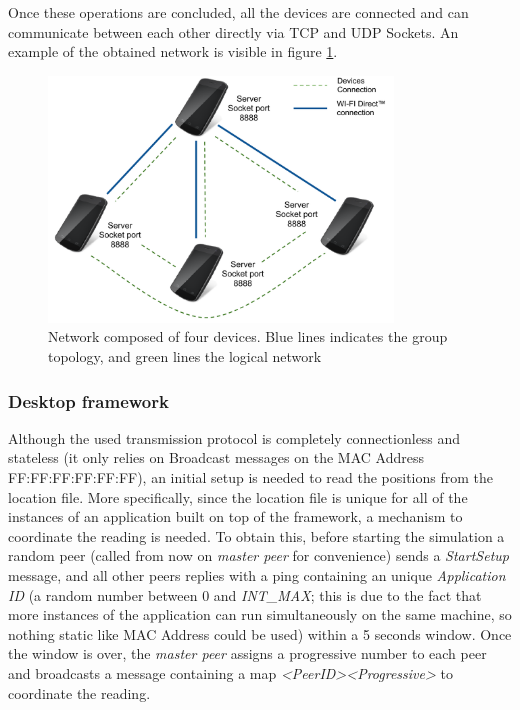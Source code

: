 Once these operations are concluded, all the devices are connected and can communicate between each other directly via TCP and UDP Sockets. An example of the obtained network is visible in figure \ref{fig:device_network}.

\begin{figure}[!htbp]
\centering
\includegraphics[width=3.6in]{imgs/Devices_network.pdf}
\caption{Network composed of four devices. Blue lines indicates the \direct group topology, and green lines the logical network}
\label{fig:device_network}
\end{figure}

\subsubsection{Desktop framework}
Although the used transmission protocol is completely connectionless and stateless (it only relies on Broadcast messages on the MAC Address FF:FF:FF:FF:FF:FF), an initial setup is needed to read the positions from the location file. More specifically, since the location file is unique for all of the instances of an application built on top of the framework, a mechanism to coordinate the reading is needed. To obtain this, before starting the simulation a random peer (called from now on \textit{master peer} for convenience) sends a \textit{StartSetup} message, and all other peers replies with a ping containing an unique \textit{Application ID} (a random number between 0 and \textit{INT\_MAX}; this is due to the fact that more instances of the application can run simultaneously on  the same machine, so nothing static like MAC Address could be used) within a 5 seconds window. Once the window is over, the \textit{master peer} assigns a progressive number to each peer and broadcasts a message containing a map \textit{\textless PeerID\textgreater\textless Progressive\textgreater} to coordinate the reading.
